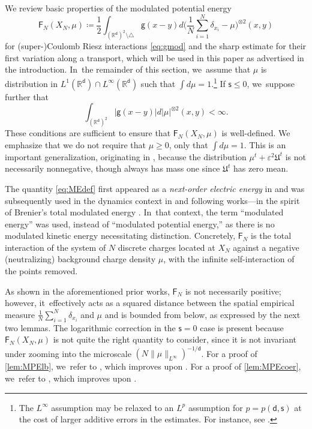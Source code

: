 \documentclass[10pt]{amsart}
\theoremstyle{plain}
\theoremstyle{definition}
\newcommand{\R}{{\mathbb{R}}}
\let\vep\varepsilon
\let\ux X
\newcommand{\XN}{X_N}
\newcommand{\Uu}{\mathfrak{U}}
\newcommand{\Fr}{\mathsf{F}}
\renewcommand{\d}{\mathsf{d}}
\newcommand{\g}{{\mathsf{g}}}
\newcommand{\s}{\mathsf{s}}
\begin{document}
We review basic properties of the modulated potential energy
\begin{equation}\label{eq:MEdef}
\Fr_N(\ux_N,\mu) \coloneqq \frac12\int_{(\R^\d)^2 \setminus\triangle}\g(x-y)d\Big(\frac1N\sum_{i=1}^N\delta_{x_i}-\mu\Big)^{\otimes2}(x,y)
\end{equation}
for (super-)Coulomb Riesz interactions \eqref{eq:gmod} and the sharp estimate for their first variation along a transport, which will be used in this paper as advertised in the introduction. In~the remainder of this section, we~assume that $\mu$ is distribution in $L^1(\R^\d) \cap L^\infty(\R^\d)$ such that $\int d\mu = 1$.\footnote{The $L^\infty$ assumption may be relaxed to an $L^p$ assumption for $p=p(\d,\s)$ at the cost of larger additive errors in the estimates. For instance, see \cite[\S 3]{Rosenzweig2022, Rosenzweig2022a}.} If $\s\le 0$, we~suppose further that
\[
\int_{(\R^\d)^2}|\g(x-y)|d|\mu|^{\otimes 2}(x,y)<\infty.
\]
These conditions are sufficient to ensure that $\Fr_N(\XN,\mu)$ is well-defined.
We emphasize that we do not require that $\mu\ge 0$, only that $\int d\mu =1$. This is an important {generalization}, originating in \cite{Rosenzweig2021ne}, because the distribution $\mu^t+\vep^2\Uu^t$ is not necessarily nonnegative, though always has mass one since $\Uu^t$ has zero mean.

The quantity \eqref{eq:MEdef} first appeared as a \emph{next-order electric energy} in \cite{SS2015,RS2016,PS2017} and was subsequently used in the dynamics context in \cite{Duerinckx2016,Serfaty2020} and following works---in the spirit of Brenier's total modulated energy \cite{Brenier2000}. In~that context, the term ``modulated energy'' was used, instead of ``modulated potential energy,'' as there is no modulated kinetic energy necessitating distinction. Concretely, {$\Fr_N$} is the total interaction of the system of $N$ discrete charges located at $\XN$ against a negative (neutralizing) background charge density $\mu$, with the infinite self-interaction of the points removed.

As shown in the aforementioned prior works, $\Fr_N$ is not necessarily positive; however, it~effectively acts as a squared distance between the spatial empirical measure $\frac1N\sum_{i=1}^N \delta_{x_i}$ and $\mu$ and is bounded from below, as expressed by the next two lemmas. The logarithmic correction in the $\s=0$ case is present because $\Fr_N(\ux_N,\mu)$ is not quite the right quantity to consider, since it is not invariant under zooming into the microscale $(N\|\mu\|_{L^\infty})^{-1/\d}$. For a proof of \cref{lem:MPElb}, we~refer to \cite[Prop.\,2.3]{RS2022}, which improves upon \cite[Cor.\,3.4]{Serfaty2020}. For a proof of \cref{lem:MPEcoer}, we~refer to \cite[Lem.\,3.1, Cor.\,3.3]{SerfatyLN}, which improves upon \cite[Prop.\,3.6]{Serfaty2020}.
\end{document}

